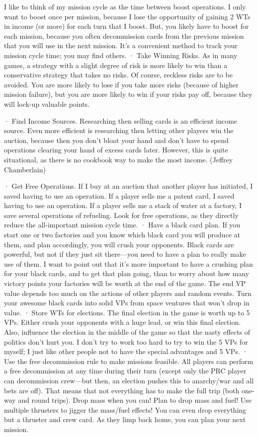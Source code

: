 \documentclass[a4paper]{book}
\begin{document}
I like to think of my mission cycle as the time between boost operations. I only want to boost once per mission, because I lose the opportunity of gaining 2 WTs in income (or more) for each turn that I boost. But, you likely have to boost for each mission, because you often decommission cards from the previous mission that you will use in the next mission. It's a convenient method to track your mission cycle time; you may find others.
·       Take Winning Risks.
As in many games, a strategy with a slight degree of risk is more likely to win than a conservative strategy that takes no risks. Of course, reckless risks are to be avoided. You are more likely to lose if you take more risks (because of higher mission failure), but you are more likely to win if your risks pay off, because they will lock-up valuable points.

·       Find Income Sources.
Researching then selling cards is an efficient income source. Even more efficient is researching then letting other players win the auction, because then you don’t bloat your hand and don’t have to spend operations clearing your hand of excess cards later. However, this is quite situational, as there is no cookbook way to make the most income. (Jeffrey Chamberlain)

·       Get Free Operations.
If I buy at an auction that another player has initiated, I saved having to use an operation. If a player sells me a patent card, I saved having to use an operation. If a player sells me a stack of water at a factory, I save several operations of refueling. Look for free operations, as they directly reduce the all-important mission cycle time.
·       Have a black card plan.
If you start one or two factories and you know which black card you will produce at them, and plan accordingly, you will crush your opponents. Black cards are powerful, but not if they just sit there—you need to have a plan to really make use of them. I want to point out that it's more important to have a crushing plan for your black cards, and to get that plan going, than to worry about how many victory points your factories will be worth at the end of the game. The end VP value depends too much on the actions of other players and random events. Turn your awesome black cards into solid VPs from space ventures that won't drop in value.
·       Store WTs for elections.
The final election in the game is worth up to 5 VPs. Either crush your opponents with a huge lead, or win this final election. Also, influence the election in the middle of the game so that the nasty effects of politics don't hurt you. I don't try to work too hard to try to win the 5 VPs for myself; I just like other people not to have the special advantages and 5 VPs.
·       Use the free decommission rule to make missions feasible.
All players can perform a free decommission at any time during their turn (except only the PRC player can decommission crew—but then, an election pushes this to anarchy/war and all bets are off). That means that not everything has to make the full trip (both one-way and round trips). Drop mass when you can! Plan to drop mass and fuel! Use multiple thrusters to jigger the mass/fuel effects! You can even drop everything but a thruster and crew card. As they limp back home, you can plan your next mission.
\end{document}
